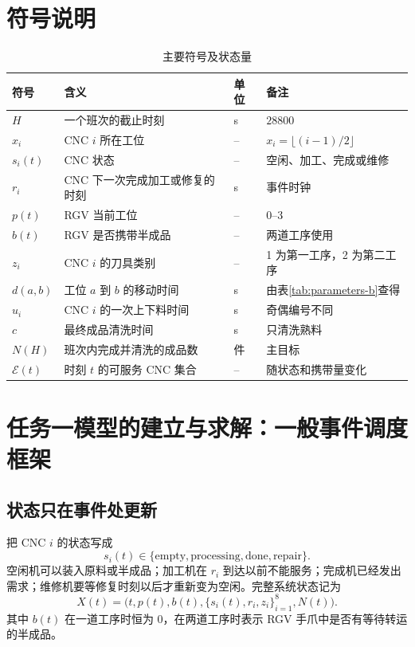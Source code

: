 \documentclass[UTF8,11pt,a4paper]{ctexart}
\begin{document}
\section{符号说明}
\begin{table}[H]
\centering
\caption{主要符号及状态量}
\label{tab:symbols-b}
\small
\begin{tabularx}{\textwidth}{p{2.4cm}p{7.2cm}p{2.1cm}X}
\toprule
符号 & 含义 & 单位 & 备注\\
\midrule
$H$ & 一个班次的截止时刻 & s & $28800$\\
$x_i$ & CNC $i$ 所在工位 & -- & $x_i=\lfloor(i-1)/2\rfloor$\\
$s_i(t)$ & CNC 状态 & -- & 空闲、加工、完成或维修\\
$r_i$ & CNC 下一次完成加工或修复的时刻 & s & 事件时钟\\
$p(t)$ & RGV 当前工位 & -- & 0--3\\
$b(t)$ & RGV 是否携带半成品 & -- & 两道工序使用\\
$z_i$ & CNC $i$ 的刀具类别 & -- & 1 为第一工序，2 为第二工序\\
$d(a,b)$ & 工位 $a$ 到 $b$ 的移动时间 & s & 由表\ref{tab:parameters-b}查得\\
$u_i$ & CNC $i$ 的一次上下料时间 & s & 奇偶编号不同\\
$c$ & 最终成品清洗时间 & s & 只清洗熟料\\
$N(H)$ & 班次内完成并清洗的成品数 & 件 & 主目标\\
$\mathcal E(t)$ & 时刻 $t$ 的可服务 CNC 集合 & -- & 随状态和携带量变化\\
\bottomrule
\end{tabularx}
\end{table}

\section{任务一模型的建立与求解：一般事件调度框架}
\label{mcm-q1-start}

\subsection{状态只在事件处更新}

把 CNC $i$ 的状态写成
\begin{equation}
s_i(t)\in\{\mathrm{empty},\mathrm{processing},\mathrm{done},\mathrm{repair}\}.
\label{eq:cnc-state-b}
\end{equation}
空闲机可以装入原料或半成品；加工机在 $r_i$ 到达以前不能服务；完成机已经发出需求；维修机要等修复时刻以后才重新变为空闲。完整系统状态记为
\begin{equation}
X(t)=\bigl(t,p(t),b(t),\{s_i(t),r_i,z_i\}_{i=1}^{8},N(t)\bigr).
\label{eq:system-state-b}
\end{equation}
其中 $b(t)$ 在一道工序时恒为 0，在两道工序时表示 RGV 手爪中是否有等待转运的半成品。
\end{document}
